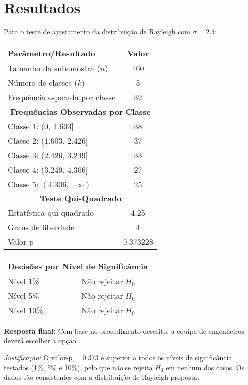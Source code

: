 \documentclass[11pt,a4paper]{article}
\begin{document}
\section*{Resultados}

\begin{tcolorbox}[colback=green!5!white,colframe=green!75!black,title=Solução]
Para o teste de ajustamento da distribuição de Rayleigh com \( \sigma = 2.4 \):

\begin{center}
\begin{tabular}{|l|c|}
\hline
\textbf{Parâmetro/Resultado} & \textbf{Valor} \\
\hline
Tamanho da subamostra (\( n \)) & 160 \\
Número de classes (\( k \)) & 5 \\
Frequência esperada por classe & 32 \\
\hline
\multicolumn{2}{|c|}{\textbf{Frequências Observadas por Classe}} \\
\hline
Classe 1: (0, 1.603] & 38 \\
Classe 2: (1.603, 2.426] & 37 \\
Classe 3: (2.426, 3.249] & 33 \\
Classe 4: (3.249, 4.306] & 27 \\
Classe 5: $(4.306, +\infty)$ & 25 \\
\hline
\multicolumn{2}{|c|}{\textbf{Teste Qui-Quadrado}} \\
\hline
Estatística qui-quadrado & 4.25 \\
Graus de liberdade & 4 \\
Valor-p & 0.373228 \\
\hline
\end{tabular}
\end{center}

\begin{center}
\begin{tabular}{|l|c|}
\hline
\multicolumn{2}{|c|}{\textbf{Decisões por Nível de Significância}} \\
\hline
Nível 1\% & Não rejeitar \( H_0 \) \\
Nível 5\% & Não rejeitar \( H_0 \) \\
Nível 10\% & Não rejeitar \( H_0 \) \\
\hline
\end{tabular}
\end{center}

\vspace{0.5cm}
\textbf{Resposta final:} Com base no procedimento descrito, a equipa de engenheiros deverá escolher a opção .

\vspace{0.3cm}
\textit{Justificação:} O valor-p = 0.373 é superior a todos os níveis de significância testados (1\%, 5\% e 10\%), pelo que não se rejeita \( H_0 \) em nenhum dos casos. Os dados são consistentes com a distribuição de Rayleigh proposta.
\end{tcolorbox}
\end{document}
